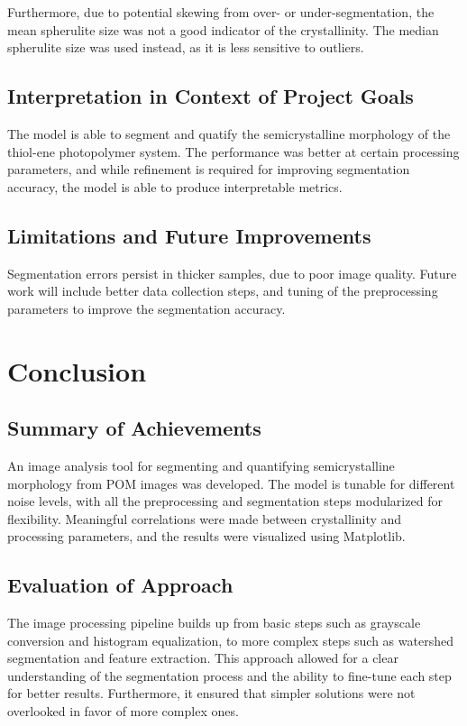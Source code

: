 \documentclass[12pt]{article}
\begin{document}
Furthermore, due to potential skewing from over- or under-segmentation, the mean spherulite size was not a good
indicator of the crystallinity. The median spherulite size was used instead, as it is less sensitive to outliers.

\subsection{Interpretation in Context of Project Goals}
The model is able to segment and quatify the semicrystalline morphology of the thiol-ene photopolymer system.
The performance was better at certain processing parameters, and while refinement is required for improving
segmentation accuracy, the model is able to produce interpretable metrics.

\subsection{Limitations and Future Improvements}
Segmentation errors persist in thicker samples, due to poor image quality. Future work will include 
better data collection steps, and tuning of the preprocessing parameters to improve the segmentation accuracy.

\section{Conclusion}

\subsection{Summary of Achievements}
An image analysis tool for segmenting and quantifying semicrystalline morphology from POM images was developed.
The model is tunable for different noise levels, with all the preprocessing and segmentation steps modularized for flexibility.
Meaningful correlations were made between crystallinity and processing parameters, and the results were visualized using Matplotlib.

\subsection{Evaluation of Approach}
The image processing pipeline builds up from basic steps such as grayscale conversion and histogram equalization, 
to more complex steps such as watershed segmentation and feature extraction. This approach allowed for a clear understanding
of the segmentation process and the ability to fine-tune each step for better results. Furthermore, it ensured that simpler 
solutions were not overlooked in favor of more complex ones.
\end{document}
